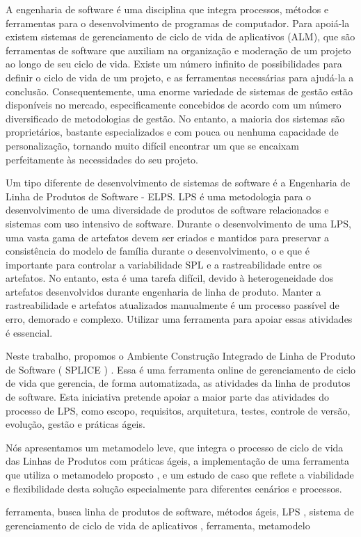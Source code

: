 
A engenharia de software é uma disciplina que integra processos, métodos e ferramentas para o desenvolvimento de programas de computador. Para apoiá-la existem sistemas de gerenciamento de ciclo de vida de aplicativos (ALM), que são ferramentas de software que auxiliam na organização e moderação de um projeto ao longo de seu ciclo de vida. Existe um número infinito de possibilidades para definir o ciclo de vida de um projeto, e as ferramentas necessárias para ajudá-la a conclusão. Consequentemente, uma enorme variedade de sistemas de gestão estão disponíveis no mercado, especificamente concebidos de acordo com um número diversificado de metodologias de gestão. No entanto, a maioria dos sistemas são proprietários, bastante especializados e com pouca ou nenhuma capacidade de personalização, tornando muito difícil encontrar um que se encaixam perfeitamente às necessidades do seu projeto.

Um tipo diferente de desenvolvimento de sistemas de software é a Engenharia de Linha de Produtos de Software - ELPS. LPS é uma metodologia para o desenvolvimento de uma diversidade de produtos de software relacionados e sistemas com uso intensivo de software. Durante o desenvolvimento de uma LPS, uma vasta gama de artefatos devem ser criados e mantidos para preservar a consistência do modelo de família durante o desenvolvimento, o e que é importante para controlar a variabilidade SPL e a rastreabilidade entre os artefatos. No entanto, esta é uma tarefa difícil, devido à heterogeneidade dos artefatos desenvolvidos durante engenharia de linha de produto. Manter a rastreabilidade e artefatos atualizados manualmente é um processo passível de erro, demorado e complexo. Utilizar uma ferramenta para apoiar essas atividades é essencial.

Neste trabalho, propomos o Ambiente Construção Integrado de Linha de Produto de Software ( SPLICE ) . Essa é uma ferramenta online de gerenciamento de ciclo de vida que gerencia, de forma automatizada, as atividades da linha de produtos de software. Esta iniciativa pretende apoiar a maior parte das atividades do processo de LPS, como escopo, requisitos, arquitetura, testes, controle de versão, evolução, gestão e práticas ágeis. 

Nós apresentamos um metamodelo leve, que integra o processo de ciclo de vida das Linhas de Produtos com práticas ágeis, a implementação de uma ferramenta que utiliza o metamodelo proposto , e um estudo de caso que reflete a viabilidade e flexibilidade desta solução especialmente para diferentes cenários e processos.


\begin{keywords}
ferramenta, busca
linha de produtos de software, métodos ágeis, LPS , sistema de gerenciamento de ciclo de vida de aplicativos  , ferramenta, metamodelo

\end{keywords}